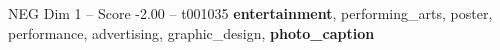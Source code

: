 \begin{textsample}{NEG Dim 1 – Score -2.00 – t001035}  \label{ex:f1_neg_026}
\textbf{entertainment}, performing\_arts, poster, performance, advertising, graphic\_design, \textbf{photo\_caption}

\end{textsample}

